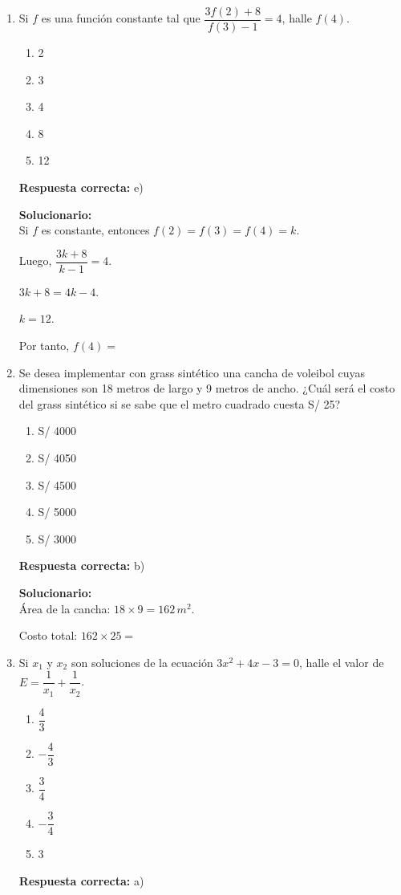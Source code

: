 \begin{enumerate}

	
	\item Si $f$ es una función constante tal que $\dfrac{3f(2)+8}{f(3)-1}=4$, halle $f(4)$.
	\begin{enumerate}[label=\alph*)]
		\item 2
		\item 3
		\item 4
		\item 8
		\item 12
	\end{enumerate}
	\textbf{Respuesta correcta:} e)
	
	\vspace{2mm}
	\textbf{Solucionario:}\\
	Si $f$ es constante, entonces $f(2)=f(3)=f(4)=k$.
	
	Luego, $\dfrac{3k+8}{k-1}=4$.
	
	$3k+8=4k-4$.
	
	$k=12$.
	
	Por tanto, $f(4)=$
	
	\vspace{6mm}
	
	\item Se desea implementar con grass sintético una cancha de voleibol cuyas dimensiones son 18 metros de largo y 9 metros de ancho. ¿Cuál será el costo del grass sintético si se sabe que el metro cuadrado cuesta S/ 25?
	\begin{enumerate}[label=\alph*)]
		\item S/ 4000
		\item S/ 4050
		\item S/ 4500
		\item S/ 5000
		\item S/ 3000
	\end{enumerate}
	\textbf{Respuesta correcta:} b)
	
	\vspace{2mm}
	\textbf{Solucionario:}\\
	Área de la cancha: $18\times 9=162\,m^2$.
	
	Costo total: $162\times 25=$
	
	\vspace{6mm}
	
	\item Si $x_1$ y $x_2$ son soluciones de la ecuación $3x^2+4x-3=0$, halle el valor de $E=\dfrac{1}{x_1}+\dfrac{1}{x_2}$.
	\begin{enumerate}[label=\alph*)]
		\item $\dfrac{4}{3}$
		\item $-\dfrac{4}{3}$
		\item $\dfrac{3}{4}$
		\item $-\dfrac{3}{4}$
		\item 3
	\end{enumerate}
	\textbf{Respuesta correcta:} a)
	

\end{enumerate}
